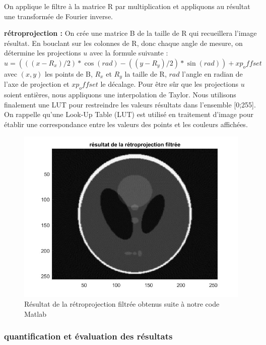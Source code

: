 \documentclass[conference]{IEEEtran}
\begin{document}
On applique le filtre à la matrice R par multiplication et appliquons au résultat une transformée de Fourier inverse.

\textbf{rétroprojection :} On crée une matrice B de la taille de R qui recueillera l'image résultat. En bouclant sur les colonnes de R, donc chaque angle de mesure, on détermine les projections $u$ avec la formule suivante :
$u=(((x-R_x)/2)*\cos(rad)-((y-R_y)/2)*\sin(rad))+xp_offset$
avec $(x,y)$ les points de B, $R_x$ et $R_y$ la taille de R, $rad$ l'angle en radian de l'axe de projection et $xp_offset$ le décalage.
Pour être sûr que les projections $u$ soient entières, nous appliquons une interpolation de Taylor.
Nous utilisons finalement une LUT pour restreindre les valeurs résultats dans l'ensemble [0;255].
On rappelle qu'une Look-Up Table (LUT) est utilisé en traitement d'image pour établir une correspondance entre les valeurs des points et les couleurs affichées.

\begin{figure}[H]
\centering
\includegraphics[scale=0.5]{rsultat-de-la-rtroprojetion-filtre}
	\caption[Résultat de la rétroprojection filtrée obtenus suite à notre code Matlab]{Résultat de la rétroprojection filtrée obtenus suite à notre code Matlab}
\label{fig:gallery}
\end{figure}



\subsubsection{quantification et évaluation des résultats}
\end{document}
